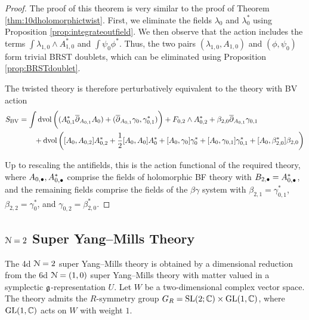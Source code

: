 \documentclass[10pt, oneside]{article}
\begin{document}
\begin{proof}
The proof of this theorem is very similar to the proof of Theorem \ref{thm:10dholomorphictwist}.  
First, we eliminate the fields $\lambda_0$ and $\lambda_0^*$ using Proposition \ref{prop:integrateoutfield}.  
We then observe that the action includes the terms $\int \lambda_{1,0} \wedge A_{1,0}^*$ and  $\int \psi_0\phi^*$. Thus, the two pairs $(\lambda_{1,0}, A_{1,0})$ and $(\phi, \psi_0)$ form trivial BRST doublets, which can be eliminated using Proposition \ref{prop:BRSTdoublet}.

The twisted theory is therefore perturbatively equivalent to the theory with BV action 
\begin{align*}
S_{\rm BV} & = \int \operatorname{dvol} \bigg((A_{0,1}^* \overline{\partial}_{A_{0,1}} A_{0}) + (\overline{\partial}_{A_{0,1}} \gamma_0, \gamma_{0,1}^*)\bigg) + F_{0,2} \wedge A_{0,2}^* + \beta_{2,0} \overline{\partial}_{A_{0,1}} \gamma_{0,1} \\ & \qquad + \operatorname{dvol} \bigg([A_0, A_{0,2}] A_{0,2}^* + \frac{1}{2} [A_0,A_0] A_0^* + [A_0, \gamma_0] \gamma_0^* + [A_0, \gamma_{0,1}] \gamma_{0,1}^* + [A_0, \beta_{2,0}^*] \beta_{2,0}\bigg)
\end{align*}

Up to rescaling the antifields, this is the action functional of the required theory, where $A_{0,\bullet}, A_{0,\bullet}^*$ comprise the fields of holomorphic BF theory with $B_{2,\bullet} = A_{0,\bullet}^*$, and the remaining fields comprise the fields of the $\beta\gamma$ system with $\beta_{2,1} = \gamma_{0,1}^*$, $\beta_{2,2} = \gamma_0^*$, and $\gamma_{0,2} = \beta_{2,0}^*$.
\end{proof}

\subsection{\texorpdfstring{$\mathcal N=2$}{N=2} Super Yang--Mills Theory} \label{4d_2_section}

The 4d $\mathcal N=2$ super Yang--Mills theory is obtained by a dimensional reduction from the 6d $\mathcal N=(1, 0)$ super Yang--Mills theory with matter valued in a symplectic $\mathfrak g$-representation $U$. Let $W$ be a two-dimensional complex vector space. The theory admits the $R$-symmetry group $G_R=\mathrm{SL}(2;\mathbb C)\times \mathrm{GL}(1, \mathbb C)$, where $\mathrm{GL}(1, \mathbb C)$ acts on $W$ with weight $1$.

\vspace{-10pt}
\end{document}
